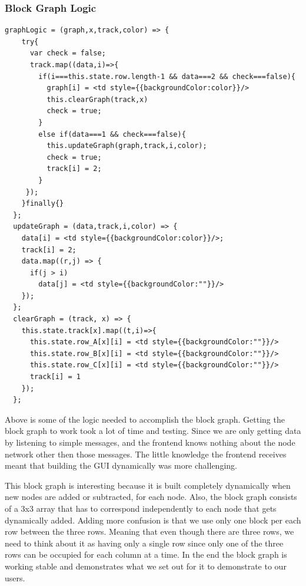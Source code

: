 \documentclass[draftclsnofoot, onecolumn, compsoc, 10pt]{IEEEtran}
\begin{document}
\subsubsection{Block Graph Logic}
\begin{lstlisting}
graphLogic = (graph,x,track,color) => {
    try{
      var check = false;
      track.map((data,i)=>{
        if(i===this.state.row.length-1 && data===2 && check===false){
          graph[i] = <td style={{backgroundColor:color}}/>
          this.clearGraph(track,x)
          check = true;
        }
        else if(data===1 && check===false){
          this.updateGraph(graph,track,i,color);     
          check = true;
          track[i] = 2;
        }
     });
    }finally{}
  };
  updateGraph = (data,track,i,color) => {
    data[i] = <td style={{backgroundColor:color}}/>;
    track[i] = 2;
    data.map((r,j) => {
      if(j > i)
        data[j] = <td style={{backgroundColor:""}}/>
    });
  };
  clearGraph = (track, x) => {
    this.state.track[x].map((t,i)=>{
      this.state.row_A[x][i] = <td style={{backgroundColor:""}}/>
      this.state.row_B[x][i] = <td style={{backgroundColor:""}}/>
      this.state.row_C[x][i] = <td style={{backgroundColor:""}}/>
      track[i] = 1
    });
  };
\end{lstlisting}
Above is some of the logic needed to accomplish the block graph. Getting the block graph to work took a lot of time and testing. Since we are only getting data by listening to simple messages, and the frontend knows nothing about the node network other then those messages. The little knowledge the frontend receives meant that building the GUI dynamically was more challenging. 

This block graph is interesting because it is built completely dynamically when new nodes are added or subtracted, for each node. Also, the block graph consists of a 3x3 array that has to correspond independently to each node that gets dynamically added. Adding more confusion is that we use only one block per each row between the three rows. Meaning that even though there are three rows, we need to think about it as having only a single row since only one of the three rows can be occupied for each column at a time. In the end the block graph is working stable and demonstrates what we set out for it to demonstrate to our users.

\end{document}
